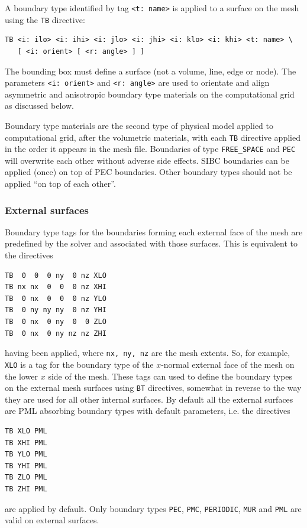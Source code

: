 \documentclass[onecolumn,a4paper]{article}
\numberwithin{equation}{section}
\begin{document}
A boundary type identified by tag \texttt{<t:~name>} is applied to a surface on the mesh using 
the \texttt{TB} directive:
\begin{verbatim}
TB <i: ilo> <i: ihi> <i: jlo> <i: jhi> <i: klo> <i: khi> <t: name> \
   [ <i: orient> [ <r: angle> ] ]
\end{verbatim}
The bounding box must define a surface (not a volume, line, edge or node). The parameters 
\texttt{<i:~orient>} and \texttt{<r:~angle>} are used to orientate and align asymmetric and
anisotropic boundary type materials on the computational grid as discussed below.

Boundary type materials are the second type of physical model applied to computational grid, after 
the volumetric materials, with each \texttt{TB} directive applied in the order it appears in 
the mesh file. Boundaries of type \texttt{FREE\_SPACE} and \texttt{PEC} will overwrite each 
other without adverse side effects. SIBC boundaries can be applied (once) on top of PEC boundaries.
Other boundary types should not be applied ``on top of each other''.

\subsubsection{External surfaces}

Boundary type tags for the boundaries forming each external face of the mesh are predefined by the solver
and associated with those surfaces. This is equivalent to the directives
\begin{verbatim}
TB  0  0  0 ny  0 nz XLO
TB nx nx  0  0  0 nz XHI
TB  0 nx  0  0  0 nz YLO
TB  0 ny ny ny  0 nz YHI
TB  0 nx  0 ny  0  0 ZLO
TB  0 nx  0 ny nz nz ZHI
\end{verbatim}
having been applied, where \texttt{nx, ny, nz} are the mesh extents. So, for example, \texttt{XLO} is a tag 
for the boundary type of the $x$-normal external face of the mesh on the lower $x$ side of the mesh. 
These tags can used to define the boundary types on the external mesh surfaces using \texttt{BT} directives,
somewhat in reverse to the way they are used for all other internal surfaces. By default all the external 
surfaces are PML absorbing boundary types with default parameters, i.e. the directives
\begin{verbatim}
TB XLO PML
TB XHI PML
TB YLO PML
TB YHI PML
TB ZLO PML
TB ZHI PML
\end{verbatim}
are applied by default. Only boundary types \texttt{PEC}, \texttt{PMC}, \texttt{PERIODIC}, \texttt{MUR} and \texttt{PML} are
valid on external surfaces.
\end{document}
